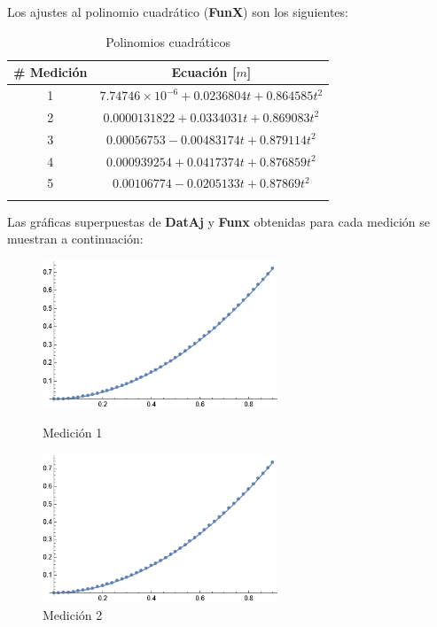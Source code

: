 \documentclass[12pt, titlepage]{report}
\begin{document}
    Los ajustes al polinomio cuadrático (\textbf{FunX}) son los siguientes:

    \begin{longtable}{|c|c|}
        \hline
        \# Medición & Ecuación [$m$] \\ \hline
        1 & $7.74746\times10^{-6} + 0.0236804 t + 0.864585 t^2$ \\ \hline
        2 & $0.0000131822 + 0.0334031 t + 0.869083 t^2$ \\ \hline
        3 & $0.00056753 - 0.00483174 t + 0.879114 t^2$ \\ \hline
        4 & $0.000939254 + 0.0417374 t + 0.876859 t^2$ \\ \hline
        5 & $0.00106774 - 0.0205133 t + 0.87869 t^2$ \\ \hline
        \caption{Polinomios cuadráticos}
    \end{longtable}

    Las gráficas superpuestas de \textbf{DatAj} y \textbf{Funx} obtenidas para cada medición se muestran a continuación:

    \begin{figure}[ht]
        \centering
        \begin{minipage}[c]{0.45\linewidth}
            \centering
            \includegraphics[width=7cm]{Graf1.png}
            \caption{Medición 1}
        \end{minipage} \hspace{.75cm}
        \begin{minipage}[c]{0.45\linewidth}
            \centering
            \includegraphics[width=7cm]{Graf2.png}
            \caption{Medición 2}
        \end{minipage}
    \end{figure}
\end{document}
